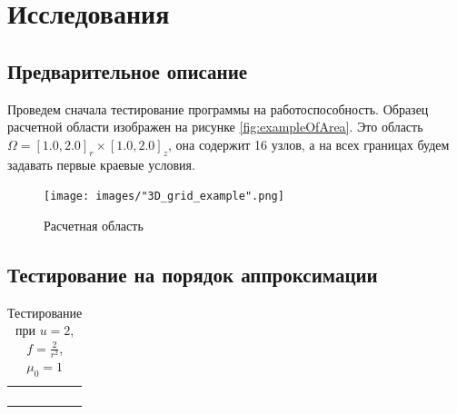 \chapter{Исследования}

\section{Предварительное описание}

Проведем сначала тестирование программы на работоспособность. Образец расчетной области изображен на рисунке \ref{fig:exampleOfArea}. Это область $\Omega = [1.0, 2.0]_r \times [1.0, 2.0]_z$, она содержит 16 узлов, а на всех границах будем задавать первые краевые условия.

\begin{figure}
	\centering
	\texttt{[image: images/"3D\_grid\_example".png]}
	\caption{Расчетная область}
	\label{fig:exampleOf3DMesh}
\end{figure}

\section{Тестирование на порядок аппроксимации}

\begin{table}
	\caption{Тестирование при $u = 2$, $f = \frac{2}{r^2}$, $\mu_0 = 1$}
	\centering
	\small
	\begin{tabularx}{1.0\textwidth}{| >{\raggedright\arraybackslash}X | >{\raggedright\arraybackslash}X | >{\raggedright\arraybackslash}X |>{\raggedright\arraybackslash}X |}
		\hline
		\centering{Узел} & \centering{Значение} & \centering{Абсолютная погрешность} & \centering{Относительная погрешность} \tabularnewline \hline
		
	

		 \centering{(${}^4/_3$; ${}^4/_3$)} & \centering{2.00226896E+000}& \centering{2.26896083E-003} & \centering{1.13448042E-003} \tabularnewline \hline
		 
		 \centering{(${}^5/_3$; ${}^4/_3$)} & \centering{2.00130487E+000} & \centering{1.30486533E-003} & \centering{6.52432666E-004} \tabularnewline \hline
  		 
  		 \centering{(${}^4/_3$; ${}^5/_3$)} & \centering{2.00226896E+000} & \centering{2.26896083E-003} & \centering{1.13448042E-003} \tabularnewline \hline
		 
		 \centering{(${}^5/_3$; ${}^5/_3$)} & \centering{2.00130487E+000} & \centering{1.30486533E-003} & \centering{6.52432666E-004} \tabularnewline \hline
		 
 	\end{tabularx}
	\label{tab:test1}
\end{table}

